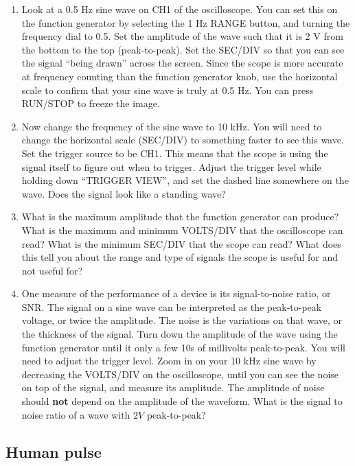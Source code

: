\begin{enumerate}
\item Look at a 0.5 Hz sine wave on CH1 of the oscilloscope. You can set this on the function generator by selecting the 1 Hz RANGE button, and turning the frequency dial to 0.5. Set the amplitude of the wave such that it is 2 V from the bottom to the top (peak-to-peak). Set the SEC/DIV so that you can see the signal ``being drawn'' across the screen. Since the scope is more accurate at frequency counting than the function generator knob, use the horizontal scale to confirm that your sine wave is truly at 0.5 Hz. You can press RUN/STOP to freeze the image.

\item Now change the frequency of the sine wave to 10 kHz. You will need to change the horizontal scale (SEC/DIV) to something faster to see this wave. Set the trigger source to be CH1. This means that the scope is using the signal itself to figure out when to trigger. Adjust the trigger level while holding down ``TRIGGER VIEW'', and set the dashed line somewhere on the wave. Does the signal look like a standing wave?

\item What is the maximum amplitude that the function generator can produce? What is the maximum and minimum VOLTS/DIV that the oscilloscope can read? What is the minimum SEC/DIV that the scope can read? What does this tell you about the range and type of signals the scope is useful for and not useful for?

\item One measure of the performance of a device is its signal-to-noise ratio, or SNR. The signal on a sine wave can be interpreted as the peak-to-peak voltage, or twice the amplitude. The noise is the variations on that wave, or the thickness of the signal. Turn down the amplitude of the wave using the function generator until it only a few 10s of millivolts peak-to-peak. You will need to adjust the trigger level. Zoom in on your 10 kHz sine wave by decreasing the VOLTS/DIV on the oscilloscope, until you can see the noise on top of the signal, and measure its amplitude. The amplitude of noise should {\bf{not}} depend on the amplitude of the waveform. What is the signal to noise ratio of a wave with $2V$ peak-to-peak?

\end{enumerate}

\subsection{Human pulse}

